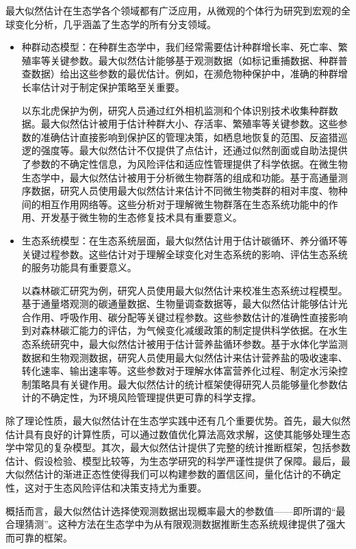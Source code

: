 \documentclass[
  twoside,12pt,fontset=none]{ctexbook}
\begin{document}
最大似然估计在生态学各个领域都有广泛应用，从微观的个体行为研究到宏观的全球变化分析，几乎涵盖了生态学的所有分支领域。

\begin{itemize}
\item
  种群动态模型：在种群生态学中，我们经常需要估计种群增长率、死亡率、繁殖率等关键参数。最大似然估计能够基于观测数据（如标记重捕数据、种群普查数据）给出这些参数的最优估计。例如，在濒危物种保护中，准确的种群增长率估计对于制定保护策略至关重要。

  以东北虎保护为例，研究人员通过红外相机监测和个体识别技术收集种群数据。最大似然估计被用于估计种群大小、存活率、繁殖率等关键参数。这些参数的准确估计直接影响到保护区的管理决策，如栖息地恢复的范围、反盗猎巡逻的强度等。最大似然估计不仅提供了点估计，还通过似然剖面或自助法提供了参数的不确定性信息，为风险评估和适应性管理提供了科学依据。在微生物生态学中，最大似然估计被用于分析微生物群落的组成和功能。基于高通量测序数据，研究人员使用最大似然估计来估计不同微生物类群的相对丰度、物种间的相互作用网络等。这些分析对于理解微生物群落在生态系统功能中的作用、开发基于微生物的生态修复技术具有重要意义。
\item
  生态系统模型：在生态系统层面，最大似然估计用于估计碳循环、养分循环等关键过程参数。这些估计对于理解全球变化对生态系统的影响、评估生态系统的服务功能具有重要意义。

  以森林碳汇研究为例，研究人员使用最大似然估计来校准生态系统过程模型。基于通量塔观测的碳通量数据、生物量调查数据等，最大似然估计能够估计光合作用、呼吸作用、碳分配等关键过程参数。这些参数估计的准确性直接影响到对森林碳汇能力的评估，为气候变化减缓政策的制定提供科学依据。在水生态系统研究中，最大似然估计被用于估计营养盐循环参数。基于水体化学监测数据和生物观测数据，研究人员使用最大似然估计来估计营养盐的吸收速率、转化速率、输出速率等。这些参数对于理解水体富营养化过程、制定水污染控制策略具有关键作用。最大似然估计的统计框架使得研究人员能够量化参数估计的不确定性，为环境风险管理提供更可靠的科学支撑。
\end{itemize}

除了理论性质，最大似然估计在生态学实践中还有几个重要优势。首先，最大似然估计具有良好的计算性质，可以通过数值优化算法高效求解，这使其能够处理生态学中常见的复杂模型。其次，最大似然估计提供了完整的统计推断框架，包括参数估计、假设检验、模型比较等，为生态学研究的科学严谨性提供了保障。最后，最大似然估计的渐进正态性使得我们可以构建参数的置信区间，量化估计的不确定性，这对于生态风险评估和决策支持尤为重要。

概括而言，最大似然估计选择使观测数据出现概率最大的参数值------即所谓的``最合理猜测''。这种方法在生态学中为从有限观测数据推断生态系统规律提供了强大而可靠的框架。
\end{document}
